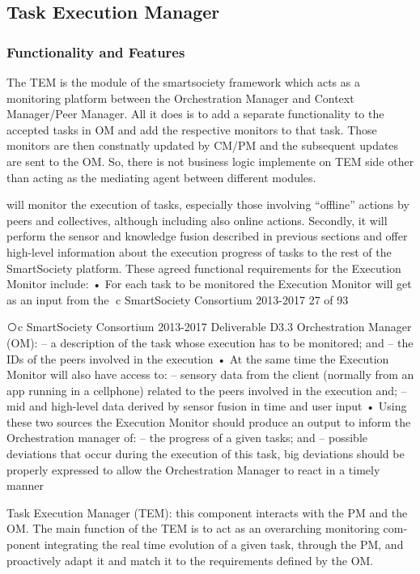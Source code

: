 \subsection{Task Execution Manager}
\subsubsection{Functionality and Features}
The TEM is the module of the smartsociety framework which acts as a monitoring platform between the Orchestration Manager and Context Manager/Peer Manager. All it does is to add a separate functionality to the accepted tasks in OM and add the respective monitors to that task. Those monitors are then constnatly updated by CM/PM and the subsequent updates are sent to the OM. So, there is not business logic implemente on TEM side other than acting as the mediating agent between different modules.

will monitor the execution of tasks, especially those involving “offline” actions by peers and collectives, although including also online actions. Secondly, it will perform the sensor and knowledge fusion described in previous sections and offer high-level information about the execution progress of tasks to the rest of the SmartSociety platform.
These agreed functional requirements for the Execution Monitor include:
• For each task to be monitored the Execution Monitor will get as an input from the ⃝c SmartSociety Consortium 2013-2017 27 of 93
 
⃝c SmartSociety Consortium 2013-2017 Deliverable D3.3
Orchestration Manager (OM):
– a description of the task whose execution has to be monitored; and
– the IDs of the peers involved in the execution
• At the same time the Execution Monitor will also have access to:
– sensory data from the client (normally from an app running in a cellphone) related to the peers involved in the execution and;
– mid and high-level data derived by sensor fusion in time and user input
• Using these two sources the Execution Monitor should produce an output to inform
the Orchestration manager of:
– the progress of a given tasks; and
– possible deviations that occur during the execution of this task, big deviations should be properly expressed to allow the Orchestration Manager to react in a timely manner

Task Execution Manager (TEM): this component interacts with the PM and the OM. The main function of the TEM is to act as an overarching monitoring com- ponent integrating the real time evolution of a given task, through the PM, and proactively adapt it and match it to the requirements defined by the OM.

